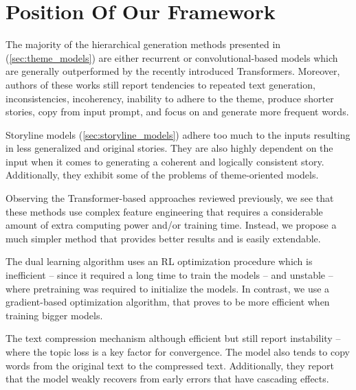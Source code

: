 
\section{Position Of Our Framework}
\label{sec:analysis_prev_work}

The majority of the hierarchical generation methods presented in (\cref{sec:theme_models}) are either recurrent or convolutional-based models which are generally outperformed by the recently introduced Transformers. Moreover, authors of these works still report tendencies to repeated text generation, inconsistencies, incoherency, inability to adhere to the theme, produce shorter stories, copy from input prompt, and focus on and generate more frequent words.

Storyline models (\cref{sec:storyline_models}) adhere too much to the inputs resulting in less generalized and original stories. They are also highly dependent on the input when it comes to generating a coherent and logically consistent story. Additionally, they exhibit some of the problems of theme-oriented models.

Observing the Transformer-based approaches reviewed previously, we see that these methods use complex feature engineering that requires a considerable amount of extra computing power and/or training time. Instead, we propose a much simpler method that provides better results and is easily extendable.

The dual learning algorithm \citep{he2016dual} uses an RL optimization procedure which is inefficient -- since it required a long time to train the models -- and unstable -- where pretraining was required to initialize the models. In contrast, we use a gradient-based optimization algorithm, that proves to be more efficient when training bigger models.

The text compression mechanism \citep{baziotis2019seq} although efficient but still report instability -- where the topic loss is a key factor for convergence. The model also tends to copy words from the original text to the compressed text. Additionally, they report that the model weakly recovers from early errors that have cascading effects.


